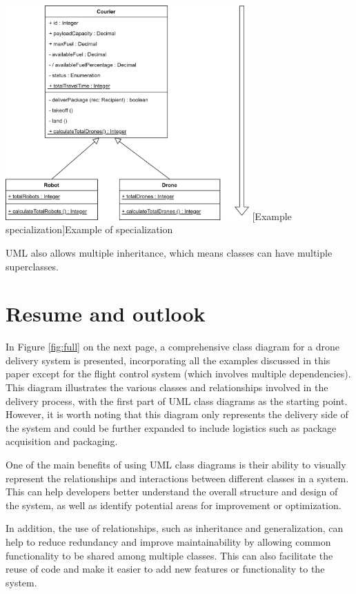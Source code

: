 \documentclass[
	12pt,
    a4paper,
    egregdoesnotlikesansseriftitles, %
    toc=chapterentrywithdots,
    oneside, openany,
    titlepage,
    parskip=half,
    headings=normal,  %
    listof=totoc,
    bibliography=totocnumbered,
    index=totoc,
    captions=tableheading,  %
    listof=flat,
    numbers=noenddot, %
    final]
    {scrbook}
\begin{document}
\vspace{1em}
\begin{minipage}{\linewidth}
	\centering
	\includegraphics[width=0.7\textwidth]{figures/inheritance/specialization.jpg}
	[Example specialization]{Example of specialization}
	\label{fig:specialization}
\end{minipage}

UML also allows multiple inheritance, which means classes can have multiple superclasses. \cite[p. 71] {seidl2015uml}

\chapter{Resume and outlook}


In Figure \ref{fig:full} on the next page, a comprehensive class diagram for a drone delivery system is presented, incorporating all the examples discussed in this paper except for the flight control system (which involves multiple dependencies). 
This diagram illustrates the various classes and relationships involved in the delivery process, with the first part of UML class diagrams \cite{levin} as the starting point. 
However, it is worth noting that this diagram only represents the delivery side of the system and could be further expanded to include logistics such as package acquisition and packaging.

One of the main benefits of using UML class diagrams is their ability to visually represent the relationships and interactions between different classes in a system. 
This can help developers better understand the overall structure and design of the system, as well as identify potential areas for improvement or optimization.

In addition, the use of relationships, such as inheritance and generalization, can help to reduce redundancy and improve maintainability by allowing common functionality to be shared among multiple classes. This can also facilitate the reuse of code and make it easier to add new features or functionality to the system.
\end{document}
